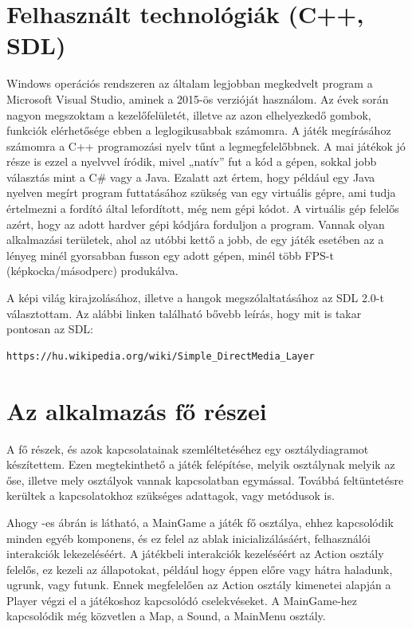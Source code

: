 \label{Chap:komponensek}

\section{Felhasznált technológiák (C++, SDL)}

Windows operációs rendszeren az általam legjobban megkedvelt program a Microsoft Visual Studio, aminek a 2015-ös verzióját használom. Az évek során nagyon megszoktam a kezelőfelületét, illetve az azon elhelyezkedő gombok, funkciók elérhetősége ebben a leglogikusabbak számomra. A játék megírásához számomra a C++ programozási nyelv tűnt a legmegfelelőbbnek. A mai játékok jó része is ezzel a nyelvvel íródik, mivel „natív” fut a kód a gépen, sokkal jobb választás mint a C\# vagy a Java. Ezalatt azt értem, hogy például egy Java nyelven megírt program futtatásához szükség van egy virtuális gépre, ami tudja értelmezni a fordító által lefordított, még nem gépi kódot. A virtuális gép felelős azért, hogy az adott hardver gépi kódjára forduljon a program. Vannak olyan alkalmazási területek, ahol az utóbbi kettő a jobb, de egy játék esetében az a lényeg minél gyorsabban fusson egy adott gépen, minél több FPS-t (képkocka/másodperc) produkálva.

A képi világ kirajzolásához, illetve a hangok megszólaltatásához az SDL 2.0-t választottam. Az alábbi linken található bővebb leírás, hogy mit is takar pontosan az SDL:

\begin{verbatim}
https://hu.wikipedia.org/wiki/Simple_DirectMedia_Layer
\end{verbatim}

\section{Az alkalmazás fő részei}

A fő részek, és azok kapcsolatainak szemléltetéséhez egy osztálydiagramot készítettem. Ezen megtekinthető a játék felépítése, melyik osztálynak melyik az őse, illetve mely osztályok vannak kapcsolatban egymással. Továbbá feltüntetésre kerültek a kapcsolatokhoz szükséges adattagok, vagy metódusok is.

Ahogy -es ábrán is látható, a MainGame a játék fő osztálya, ehhez kapcsolódik minden egyéb komponens, és ez felel az ablak inicializálásáért, felhasználói interakciók lekezeléséért. A játékbeli interakciók kezeléséért az Action osztály felelős, ez kezeli az állapotokat, például hogy éppen előre vagy hátra haladunk, ugrunk, vagy futunk. Ennek megfelelően az Action osztály kimenetei alapján a Player végzi el a játékoshoz kapcsolódó cselekvéseket. A MainGame-hez kapcsolódik még közvetlen a Map, a Sound, a MainMenu osztály. 

